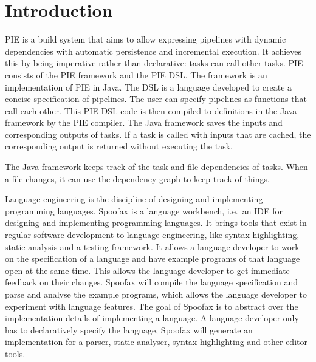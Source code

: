 
\chapter{\label{chap:introduction}Introduction}


\Ac{PIE} is a build system that aims to allow expressing pipelines with dynamic dependencies with automatic persistence and incremental execution.
It achieves this by being imperative rather than declarative: tasks can call other tasks.
\Ac{PIE} consists of the PIE framework and the \ac{PIE} \ac{DSL}.
The framework is an implementation of \ac{PIE} in Java.
The \ac{DSL} is a language developed to create a concise specification of pipelines.
The user can specify pipelines as functions that call each other.
This \ac{PIE} \ac{DSL} code is then compiled to definitions in the Java framework by the \ac{PIE} compiler.
The Java framework saves the inputs and corresponding outputs of tasks.
If a task is called with inputs that are cached, the corresponding output is returned without executing the task.

The Java framework keeps track of the task and file dependencies of tasks.
When a file changes, it can use the dependency graph to keep track of things.




Language engineering is the discipline of designing and implementing programming languages.
Spoofax is a language workbench, i.e.\ an IDE for designing and implementing programming languages.
It brings tools that exist in regular software development to language engineering, like syntax highlighting, static analysis and a testing framework.
It allows a language developer to work on the specification of a language and have example programs of that language open at the same time.
This allows the language developer to get immediate feedback on their changes.
Spoofax will compile the language specification and parse and analyse the example programs, which allows the language developer to experiment with language features.
The goal of Spoofax is to abstract over the implementation details of implementing a language.
A language developer only has to declaratively specify the language, Spoofax will generate an implementation for a parser, static analyser, syntax highlighting and other editor tools.

